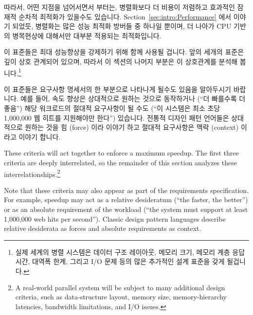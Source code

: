 \begin{description}
\fi

	따라서, 어떤 지점을 넘어서면서 부터는, 병렬화보다 더 비용이 저렴하고
	효과적인 잠재적 순차적 최적화가 있을수도 있습니다.
	Section~\ref{sec:intro:Performance} 에서 이야기 되었듯, 병렬화는 많은
	성능 최적화 방버들 중 하나일 뿐이며, 더 나아가 CPU 기반의 병목현상에
	대해서만 대부분 적용되는 최적화입니다.

	\iffalse

	Therefore, beyond a certain point,
	there may be potential sequential optimizations
	that are cheaper and more effective than parallelization.
	As noted in
	Section~\ref{sec:intro:Performance},
	parallelization is but one performance optimization of
	many, and is furthermore an optimization that applies
	most readily to CPU-based bottlenecks.

	\fi

\end{description}
이 표준들은 최대 성능향상을 강제하기 위해 함께 사용될 겁니다.
앞의 세개의 표준은 깊이 상호 관계되어 있으며, 따라서 이 섹션의 나머지 부분은 이
상호관계를 분석해 봅니다.\footnote{
	실제 세계의 병렬 시스템은 데이터 구조 레이아웃, 메모리 크기, 메모리
	계층 응답시간, 대역폭 한계, 그리고 I/O 문제 등의 많은 추가적인 설계
	표준을 갖게 될겁니다.}

이 표준들은 요구사항 명세서의 한 부분으로 나타나게 될수도 있음을 알아두시기
바랍니다.
예를 들어, 속도 향상은 상대적으로 원하는 것으로 동작하거나 (``더 빠를수록 더
좋음'') 해당 워크로드의 절대적 요구사항이 될 수도 (``이 시스템은 최소 초당
1,000,000 웹 히트를 지원해야만 한다'') 있습니다.
전통적 디자인 패턴 언어들은 상대적으로 원하는 것을 힘 (force) 이라 이야기 하고
절대적 요구사항은 맥락 (context) 이라고 이야기 합니다.

\iffalse

These criteria will act together to enforce a maximum speedup.
The first three criteria are deeply interrelated, so
the remainder of this section analyzes these
interrelationships.\footnote{
	A real-world parallel system will be subject to many additional
	design criteria, such as data-structure layout,
	memory size, memory-hierarchy latencies, bandwidth limitations,
	and I/O issues.}

Note that these criteria may also appear as part of the requirements
specification.
For example, speedup may act as a relative desideratum
(``the faster, the better'')
or as an absolute requirement of the workload (``the system
must support at least 1,000,000 web hits per second'').
Classic design pattern languages describe relative desiderata as forces
and absolute requirements as context.

